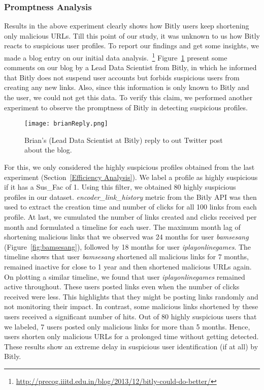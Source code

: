 \documentclass[conference]{IEEEtran}
\begin{document}
\subsubsection{Promptness Analysis}
Results in the above experiment clearly shows how Bitly users keep shortening only malicious URLs. Till this point of our study, it was unknown to us how Bitly reacts to suspicious user profiles.
To report our findings and get some insights, we made a blog entry on our initial data analysis.~\footnote{\url{http://precog.iiitd.edu.in/blog/2013/12/bitly-could-do-better/}} Figure~\ref{fig:brianReply} present some comments on our blog by a Lead Data Scientist from Bitly, in which he informed that Bitly does not suspend user accounts but forbids suspicious users from creating any new links. Also, since this information is only known to Bitly and the user, we could not get this data. To verify this claim, we performed another experiment to observe the promptness of Bitly in detecting suspicious profiles. 
\begin{figure}[h!]
 	\centering
		\texttt{[image: brianReply.png]}
	\caption{Brian's (Lead Data Scientist at Bitly) reply to out Twitter post about the blog.}
		\label{fig:brianReply}
\end{figure}
 For this, we only considered the highly suspicious profiles obtained from the last experiment (Section~\ref{Efficiency Analysis}). We label a profile as highly suspicious if it has a Sus\_Fac of 1.
Using this filter, we obtained 80 highly suspicious profiles in our dataset. \textit{encoder\_link\_history} metric from the Bitly API was then used to extract the creation time and number of clicks for all 100 links from each profile. At last, we cumulated the number of links created and clicks received per month and formulated a timeline for each user. The maximum month lag of shortening malicious links that we observed was 24 months for user \textit{bamsesang} (Figure~\ref{fig:bamsesang}), followed by 18 months for user \textit{iplayonlinegames}. The timeline shows that user \textit{bamsesang} shortened all malicious links for 7 months, remained inactive for close to 1 year and then shortened malicious URLs again. On plotting a similar timeline, we found that user \textit{iplayonlinegames} remained active throughout. These users posted links even when the number of clicks received were less. This highlights that they might be posting links randomly and not monitoring their impact. In contrast, some malicious links shortened by these users received a significant number of hits. Out of 80 highly suspicious users that we labeled, 7 users posted only malicious links for more than 5 months. Hence, users shorten only malicious URLs for a prolonged time without getting detected. These results show an extreme delay in suspicious user identification (if at all) by Bitly. 
\end{document}
